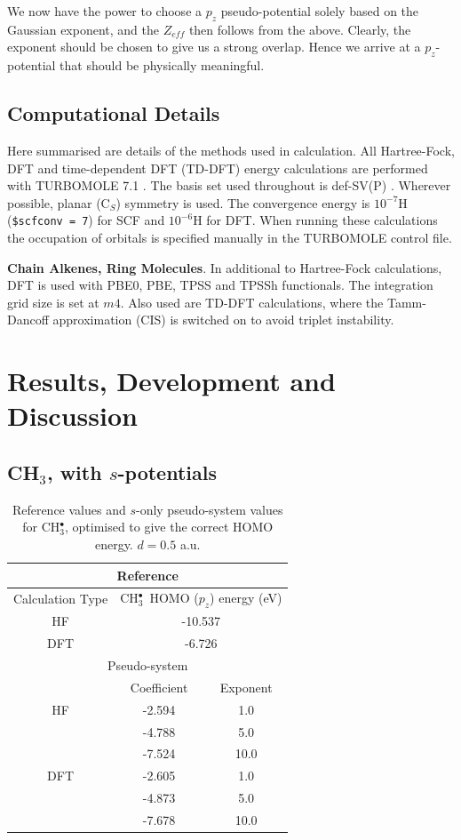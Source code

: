 \documentclass[journal=jctcce,manuscript=article]{achemso}
\begin{document}
We now have the power to choose a \(p_{z}\) pseudo-potential solely based on the Gaussian exponent, and the \(Z_{eff}\) then follows from the above. Clearly, the exponent should be chosen to give us a strong overlap. Hence we arrive at a \(p_{z}\)-potential that should be physically meaningful. 

\subsection{Computational Details}

Here summarised are details of the methods used in calculation. All Hartree-Fock, DFT and time-dependent DFT (TD-DFT) energy calculations are performed with TURBOMOLE 7.1 \cite{TURBOMOLE}. The basis set used throughout is def-SV(P) \cite{defsvp}. Wherever possible, planar (C\(_{S}\)) symmetry is used. The convergence energy is \(10^{-7}\)H (\texttt{\$scfconv = 7}) for SCF and \(10^{-6}\)H for DFT. When running these calculations the occupation of orbitals is specified manually in the TURBOMOLE control file.

\textbf{Chain Alkenes, Ring Molecules}. In additional to Hartree-Fock calculations, DFT is used with PBE0, PBE, TPSS and TPSSh functionals. \cite{pbe0,pbe,tpss,tpssh} The integration grid size is set at \(m4\). Also used are TD-DFT calculations, where the Tamm-Dancoff approximation (CIS) \cite{tammdancoff} is switched on to avoid triplet instability.

\section{Results, Development and Discussion}
\subsection{CH\(_{3}\), with \(s\)-potentials}

\begin{table}[ht]
\caption{Reference values and \(s\)-only pseudo-system values for CH\(^{\bullet}_{3}\), optimised to give the correct HOMO energy. \(d = 0.5\) a.u.}
\begin{tabular}{c c c}
\hline
\multicolumn{3}{c}{Reference} \\
\hline\hline
Calculation Type & \multicolumn{2}{c}{CH\(^{\bullet}_{3}\)\, HOMO (\(p_{z}\)) energy (eV)} \\
\hline
HF & \multicolumn{2}{c}{-10.537} \\
DFT & \multicolumn{2}{c}{-6.726} \\
\hline
\multicolumn{3}{c}{Pseudo-system} \\
\hline\hline
 & Coefficient & Exponent \\ [0.5ex]
\hline
HF & -2.594 & 1.0 \\
 & -4.788 & 5.0 \\
 & -7.524 & 10.0 \\
\hline
DFT & -2.605 & 1.0 \\
 & -4.873 & 5.0 \\
 & -7.678 & 10.0 \\
\hline
\end{tabular}
\label{table:ch3_s_potentials}
\end{table}
\end{document}

